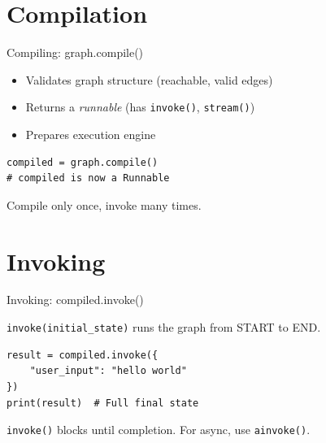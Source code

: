 \documentclass[aspectratio=169,11pt]{beamer}
\begin{document}
\section{Compilation}
\begin{frame}[fragile,t]{Compiling: graph.compile()}
\vspace{0.1cm}

\begin{conceptbox}
\setlength{\itemsep}{1pt}
\begin{itemize}
  \item Validates graph structure (reachable, valid edges)
  \item Returns a \textit{runnable} (has \texttt{invoke()}, \texttt{stream()})
  \item Prepares execution engine
\end{itemize}
\end{conceptbox}

\vspace{0.15cm}

\begin{codebox}[Compile]
\begin{lstlisting}
compiled = graph.compile()
# compiled is now a Runnable
\end{lstlisting}
\end{codebox}

\vspace{0.15cm}

{\footnotesize Compile only once, invoke many times.}
\end{frame}

\section{Invoking}
\begin{frame}[fragile,t]{Invoking: compiled.invoke()}
\vspace{0.1cm}

\begin{conceptbox}[Execution]
\texttt{invoke(initial\_state)} runs the graph from START to END.
\end{conceptbox}

\vspace{0.1cm}

\begin{codebox}
\begin{lstlisting}
result = compiled.invoke({
    "user_input": "hello world"
})
print(result)  # Full final state
\end{lstlisting}
\end{codebox}

\vspace{0.1cm}

\begin{tipbox}[Synchronous]
\texttt{invoke()} blocks until completion. For async, use \texttt{ainvoke()}.
\end{tipbox}
\end{frame}
\end{document}
